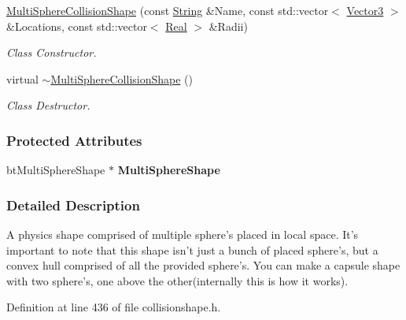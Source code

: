 \begin{DoxyCompactItemize}
\hyperlink{classphys_1_1MultiSphereCollisionShape_aa677ef7e41f2293dc744011cce539c33}{MultiSphereCollisionShape} (const \hyperlink{namespacephys_aa03900411993de7fbfec4789bc1d392e}{String} \&Name, const std::vector$<$ \hyperlink{classphys_1_1Vector3}{Vector3} $>$ \&Locations, const std::vector$<$ \hyperlink{namespacephys_af7eb897198d265b8e868f45240230d5f}{Real} $>$ \&Radii)
\begin{DoxyCompactList}\small\item\em Class Constructor. \item\end{DoxyCompactList}\item 
\hypertarget{classphys_1_1MultiSphereCollisionShape_a8f28813f184d4e3cff9f9027ca304ce8}{
virtual \hyperlink{classphys_1_1MultiSphereCollisionShape_a8f28813f184d4e3cff9f9027ca304ce8}{$\sim$MultiSphereCollisionShape} ()}
\label{classphys_1_1MultiSphereCollisionShape_a8f28813f184d4e3cff9f9027ca304ce8}

\begin{DoxyCompactList}\small\item\em Class Destructor. \item\end{DoxyCompactList}\end{DoxyCompactItemize}
\subsubsection*{Protected Attributes}
\begin{DoxyCompactItemize}
\item 
\hypertarget{classphys_1_1MultiSphereCollisionShape_aade2b9d7d83fd77e858df6dca00a33ff}{
btMultiSphereShape $\ast$ {\bfseries MultiSphereShape}}
\label{classphys_1_1MultiSphereCollisionShape_aade2b9d7d83fd77e858df6dca00a33ff}

\end{DoxyCompactItemize}


\subsubsection{Detailed Description}
A physics shape comprised of multiple sphere's placed in local space. It's important to note that this shape isn't just a bunch of placed sphere's, but a convex hull comprised of all the provided sphere's. You can make a capsule shape with two sphere's, one above the other(internally this is how it works). 

Definition at line 436 of file collisionshape.h.



